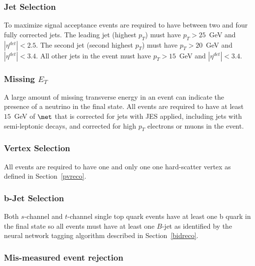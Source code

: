 \subsubsection{Jet Selection}
\label{jetselection}

To maximize signal acceptance events are required to have between two and four fully corrected jets. The leading jet (highest $p_{T}$) must have $p_{T}>25$~GeV and $|\eta^{det}|<2.5$. The second jet (second highest $p_{T}$) must have $p_{T}>20$~GeV and $|\eta^{det}|<3.4$. All other jets in the event must have $p_{T}>15$~GeV and $|\eta^{det}|<3.4$.


\subsubsection{Missing $E_{T}$}
\label{missingetselection}

A large amount of missing transverse energy in an event can indicate the presence of a neutrino in the final state. All events are required to have at least $15$~GeV of $\met$ that is corrected for jets with JES applied, including jets with semi-leptonic decays, and corrected for high $p_{T}$ electrons or muons in the event.

\subsubsection{Vertex Selection}
\label{vertexselection}

All events are required to have one and only one one hard-scatter vertex as defined in Section~\ref{pvreco}.

\subsubsection{b-Jet Selection}
\label{bjetselection}

Both $s$-channel and $t$-channel single top quark events have at least one b quark in the final state so all events must have at least one $B$-jet as identified by the neural network tagging algorithm described in Section~\ref{bidreco}.

\subsubsection{Mis-measured event rejection}
\label{misidselection}

